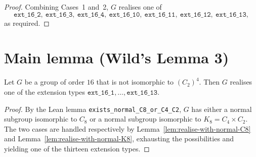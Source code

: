 \begin{proof}
  \smallskip
  Combining Cases~1 and~2, $G$ realises one of
  \[
    \mathtt{ext\_16\_2},\ \mathtt{ext\_16\_3},\ \mathtt{ext\_16\_4},\
    \mathtt{ext\_16\_10},\ \mathtt{ext\_16\_11},\ \mathtt{ext\_16\_12},\
    \mathtt{ext\_16\_13},
  \]
  as required.
\end{proof}

\section{Main lemma (Wild's Lemma 3)}

\begin{theorem}
  \label{thm:realise-ext-type-if-not-iso-to-C2-4}
  Let $G$ be a group of order $16$ that is not isomorphic to $(C_2)^4$. Then
  $G$ realises one of the extension types $\mathtt{ext\_16\_1}, \dots,
  \mathtt{ext\_16\_13}$.
\end{theorem}

\begin{proof}
  By the Lean lemma \texttt{exists\_normal\_C8\_or\_C4\_C2}, $G$ has either a
  normal subgroup isomorphic to $C_8$ or a normal subgroup isomorphic to
  $K_8 = C_4 \times C_2$. The two cases are handled respectively by
  Lemma~\ref{lem:realise-with-normal-C8} and
  Lemma~\ref{lem:realise-with-normal-K8}, exhausting the possibilities and
  yielding one of the thirteen extension types.
\end{proof}


